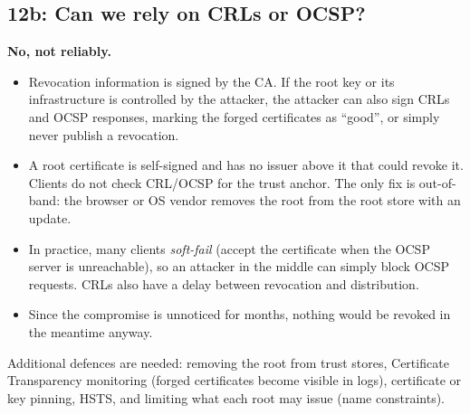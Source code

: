         \subsection{12b: Can we rely on CRLs or OCSP?}

            \textbf{No, not reliably.}
            \begin{itemize}
                \item Revocation information is signed by the CA. If the root key or its
                    infrastructure is controlled by the attacker, the attacker can also
                    sign CRLs and OCSP responses, marking the forged certificates as
                    ``good'', or simply never publish a revocation.
                \item A root certificate is self-signed and has no issuer above it that could
                    revoke it. Clients do not check CRL/OCSP for the trust anchor. The only
                    fix is out-of-band: the browser or OS vendor removes the root from the
                    root store with an update.
                \item In practice, many clients \emph{soft-fail} (accept the certificate when
                    the OCSP server is unreachable), so an attacker in the middle can simply
                    block OCSP requests. CRLs also have a delay between revocation and
                    distribution.
                \item Since the compromise is unnoticed for months, nothing would be revoked
                    in the meantime anyway.
            \end{itemize}

            Additional defences are needed: removing the root from trust stores, Certificate
            Transparency monitoring (forged certificates become visible in logs), certificate
            or key pinning, HSTS, and limiting what each root may issue (name constraints).


